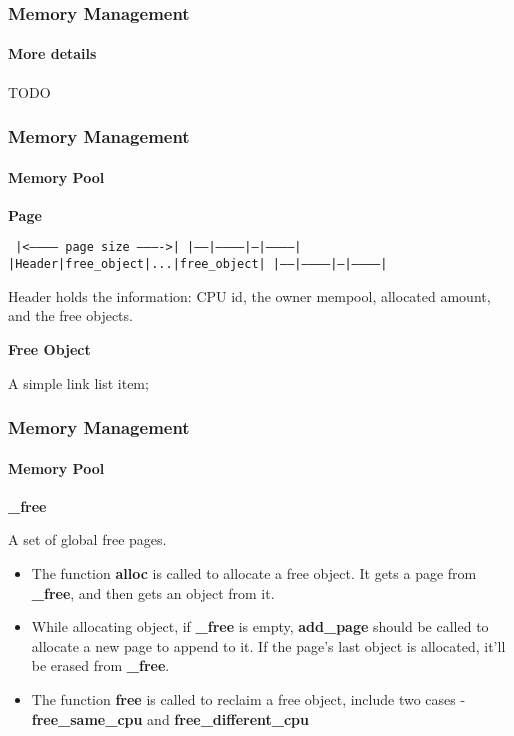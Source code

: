 \documentclass[10pt]{beamer}
\begin{document}
\begin{frame}
	\frametitle{Memory Management}
	\framesubtitle{More details}
		
\center
TODO

\end{frame}


\begin{frame}
	\frametitle{Memory Management}
	\framesubtitle{Memory Pool}
	
	\textbf{Page}	
	\begin{center}
		\texttt{
		|<----------- page size ---------->|
		|------|-----------|---|-----------|
		|Header|free\_object|...|free\_object|
		|------|-----------|---|-----------|
		}
	\end{center}
	
	\smallskip

	Header holds the information: CPU id, the owner mempool, allocated amount, and the free objects.
	
	\medskip

	\textbf{Free Object}
	
	A simple link list item;
	
\end{frame}



\begin{frame}
	\frametitle{Memory Management}
	\framesubtitle{Memory Pool}
	
	\textbf{\_free}	
	
	A set of global free pages.
	
	\begin{itemize}
		\item The function \textbf{alloc} is called to allocate a free object. It gets a page from \textbf{\_free}, and then gets an object from it.
		\item While allocating object, if \textbf{\_free} is empty, \textbf{add\_page} should be called to allocate a new page to append to it. If the page's last object is allocated, it'll be erased from \textbf{\_free}.
		\item The function \textbf{free} is called to reclaim a free object, include two cases - \textbf{free\_same\_cpu} and \textbf{free\_different\_cpu}
		
	\end{itemize}		
	
\end{frame}
\end{document}
